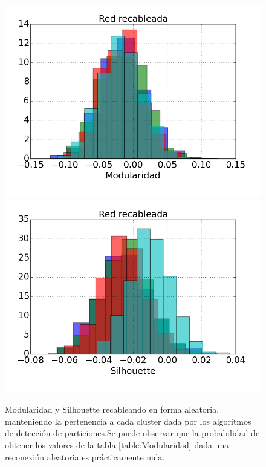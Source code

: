 \begin{figure}
\centering
\includegraphics[scale = 0.5]{figuras/Modularidad_random}
\includegraphics[scale = 0.5]{figuras/Silhouette_random}
\caption{Modularidad y Silhouette recableando en forma aleatoria, manteniendo la pertenencia a cada cluster dada por los algoritmos de detección de particiones.Se puede observar que la probabilidad de obtener los valores de la tabla \ref{table:Modularidad} dada una reconexión aleatoria es prácticamente nula.}
\label{fig:Modularidad_random}
\end{figure}
